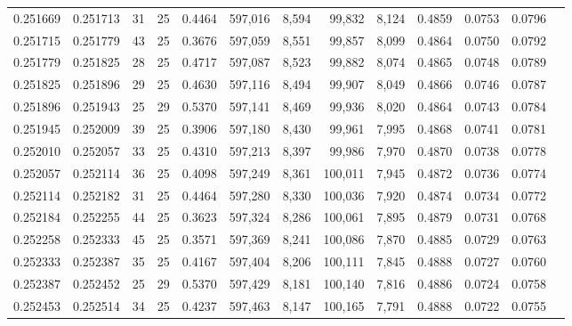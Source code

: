 \begin{tabular}{rrrrrrrrrrrrr}
0.251669 & 0.251713 &    31 &  25 &                                     0.4464 & 597,016 &   8,594 &  99,832 &   8,124 & 0.4859 & 0.0753 & 0.0796 \\
0.251715 & 0.251779 &    43 &  25 &                                     0.3676 & 597,059 &   8,551 &  99,857 &   8,099 & 0.4864 & 0.0750 & 0.0792 \\
0.251779 & 0.251825 &    28 &  25 &                                     0.4717 & 597,087 &   8,523 &  99,882 &   8,074 & 0.4865 & 0.0748 & 0.0789 \\
0.251825 & 0.251896 &    29 &  25 &                                     0.4630 & 597,116 &   8,494 &  99,907 &   8,049 & 0.4866 & 0.0746 & 0.0787 \\
0.251896 & 0.251943 &    25 &  29 &                                     0.5370 & 597,141 &   8,469 &  99,936 &   8,020 & 0.4864 & 0.0743 & 0.0784 \\
0.251945 & 0.252009 &    39 &  25 &                                     0.3906 & 597,180 &   8,430 &  99,961 &   7,995 & 0.4868 & 0.0741 & 0.0781 \\
0.252010 & 0.252057 &    33 &  25 &                                     0.4310 & 597,213 &   8,397 &  99,986 &   7,970 & 0.4870 & 0.0738 & 0.0778 \\
0.252057 & 0.252114 &    36 &  25 &                                     0.4098 & 597,249 &   8,361 & 100,011 &   7,945 & 0.4872 & 0.0736 & 0.0774 \\
0.252114 & 0.252182 &    31 &  25 &                                     0.4464 & 597,280 &   8,330 & 100,036 &   7,920 & 0.4874 & 0.0734 & 0.0772 \\
0.252184 & 0.252255 &    44 &  25 &                                     0.3623 & 597,324 &   8,286 & 100,061 &   7,895 & 0.4879 & 0.0731 & 0.0768 \\
0.252258 & 0.252333 &    45 &  25 &                                     0.3571 & 597,369 &   8,241 & 100,086 &   7,870 & 0.4885 & 0.0729 & 0.0763 \\
0.252333 & 0.252387 &    35 &  25 &                                     0.4167 & 597,404 &   8,206 & 100,111 &   7,845 & 0.4888 & 0.0727 & 0.0760 \\
0.252387 & 0.252452 &    25 &  29 &                                     0.5370 & 597,429 &   8,181 & 100,140 &   7,816 & 0.4886 & 0.0724 & 0.0758 \\
0.252453 & 0.252514 &    34 &  25 &                                     0.4237 & 597,463 &   8,147 & 100,165 &   7,791 & 0.4888 & 0.0722 & 0.0755 \\

\end{tabular}
